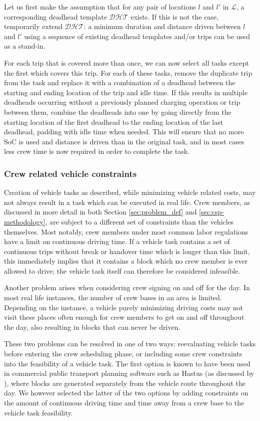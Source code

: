 \documentclass[]{article}
\begin{document}
Let us first make the assumption that for any pair of locations $l$ and $l'$ in $\mathcal{L}$, a corresponding deadhead template $\mathcal{DHT}$ exists. If this is not the case, temporarily extend $\mathcal{DHT}$: a minimum duration and distance driven between $l$ and $l'$ using a sequence of existing deadhead templates and/or trips can be used as a stand-in. 

For each trip that is covered more than once, we can now select all tasks except the first which covers this trip. For each of these tasks, remove the duplicate trip from the task and replace it with a combination of a deadhead between the starting and ending location of the trip and idle time. If this results in multiple deadheads occurring without a previously planned charging operation or trip between them, combine the deadheads into one by going directly from the starting location of the first deadhead to the ending location of the last deadhead, padding with idle time when needed. This will ensure that no more SoC is used and distance is driven than in the original task, and in most cases less crew time is now required in order to complete the task.  

\subsubsection{Crew related vehicle constraints}
Creation of vehicle tasks as described, while minimizing vehicle related costs, may not always result in a task which can be executed in real life. Crew members, as discussed in more detail in both Section \ref{sec:problem_def} and \ref{sec:csp-methodology}, are subject to a different set of constraints than the vehicles themselves. Most notably, crew members under most common labor regulations have a limit on continuous driving time. If a vehicle task contains a set of continuous trips without break or handover time which is longer than this limit, this immediately implies that it contains a block which no crew member is ever allowed to drive; the vehicle task itself can therefore be considered infeasible.  

Another problem arises when considering crew signing on and off for the day. In most real life instances, the number of crew bases in an area is limited. Depending on the instance, a vehicle purely minimizing driving costs may not visit these places often enough for crew members to get on and off throughout the day, also resulting in blocks that can never be driven.   

These two problems can be resolved in one of two ways: reevaluating vehicle tasks before entering the crew scheduling phase, or including some crew constraints into the feasibility of a vehicle task. The first option is known to have been used in commercial public transport planning software such as Hastus (as discussed by \citet{Hastus90}), where blocks are generated separately from the vehicle route throughout the day. We however selected the latter of the two options by adding constraints on the amount of continuous driving time and time away from a crew base to the vehicle task feasibility.
\end{document}

